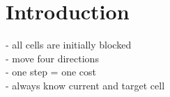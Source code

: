 \section{Introduction}
- all cells are initially blocked \\
- move four directions \\
- one step = one cost \\
- always know current and target cell \\

